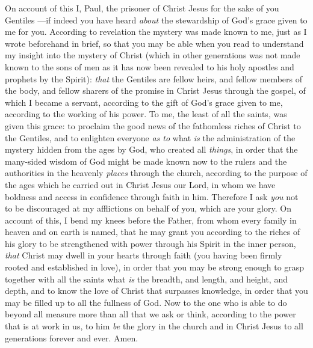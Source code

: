 \begin{biblechapter} %
 On account of this I, Paul, the prisoner of Christ Jesus for the sake of you Gentiles
\verse —if indeed you have heard \textit{about} the stewardship of God’s grace given to me for you.
\verse According to revelation the mystery was made known to me, just as I wrote beforehand in brief,
\verse so that you may be able when you read to understand my insight into the mystery of Christ
\verse (which in other generations was not made known to the sons of men as it has now been revealed to his holy apostles and prophets by the Spirit):
\verse \textit{that} the Gentiles are fellow heirs, and fellow members of the body, and fellow sharers of the promise in Christ Jesus through the gospel,
\verse of which I became a servant, according to the gift of God’s grace given to me, according to the working of his power.
\verse To me, the least of all the saints, was given this grace: to proclaim the good news of the fathomless riches of Christ to the Gentiles,
\verse and to enlighten everyone \textit{as to} what \textit{is} the administration of the mystery hidden from the ages by God, who created all \textit{things},
\verse in order that the many-sided wisdom of God might be made known now to the rulers and the authorities in the heavenly \textit{places} through the church,
\verse according to the purpose of the ages which he carried out in Christ Jesus our Lord,
\verse in whom we have boldness and access in confidence through faith in him.
\verse Therefore I ask \textit{you} not to be discouraged at my afflictions on behalf of you, which are your glory.
 On account of this, I bend my knees before the Father,
\verse from whom every family in heaven and on earth is named,
\verse that he may grant you according to the riches of his glory to be strengthened with power through his Spirit in the inner person,
\verse \textit{that} Christ may dwell in your hearts through faith (you having been firmly rooted and established in love),
\verse in order that you may be strong enough to grasp together with all the saints what \textit{is} the breadth, and length, and height, and depth,
\verse and to know the love of Christ that surpasses knowledge, in order that you may be filled up to all the fullness of God.
\verse Now to the one who is able to do beyond all measure more than all that we ask or think, according to the power that is at work in us,
\verse to him \textit{be} the glory in the church and in Christ Jesus to all generations forever and ever. Amen.
\end{biblechapter}

